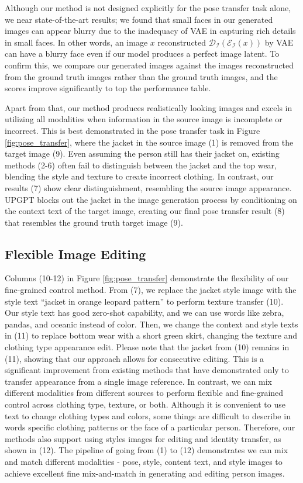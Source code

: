 \documentclass[10pt,twocolumn,letterpaper]{article}
\begin{document}
Although our method is not designed explicitly for the pose transfer task alone, we near state-of-the-art results; we found that small faces in our generated images can appear blurry due to the inadequacy of VAE in capturing rich details in small faces. In other words, an image $x$ reconstructed $\mathcal{D_I}(\mathcal{E_I}(x))$ by VAE can have a blurry face even if our model produces a perfect image latent. To confirm this, we compare our generated images against the images reconstructed from the ground truth images rather than the ground truth images, and the scores improve significantly to top the performance table. 

Apart from that, our method produces realistically looking images and excels in utilizing all modalities when information in the source image is incomplete or incorrect. This is best demonstrated in the pose transfer task in Figure \ref{fig:pose_transfer}, where the jacket in the source image (1) is removed from the target image (9). Even assuming the person still has their jacket on, existing methods (2-6) often fail to distinguish between the jacket and the top wear, blending the style and texture to create incorrect clothing. In contrast, our results (7) show clear distinguishment, resembling the source image appearance. UPGPT blocks out the jacket in the image generation process by conditioning on the context text of the target image, creating our final pose transfer result (8) that resembles the ground truth target image (9). 

\subsection{Flexible Image Editing}
Columns (10-12) in Figure \ref{fig:pose_transfer} demonstrate the flexibility of our fine-grained control method. From (7), we replace the jacket style image with the style text ``jacket in orange leopard pattern'' to perform texture transfer (10). Our style text has good zero-shot capability, and we can use words like zebra, pandas, and oceanic instead of color. Then, we change the context and style texts in (11) to replace bottom wear with a short green skirt, changing the texture and clothing type \ie appearance edit. Please note that the jacket from (10) remains in (11), showing that our approach allows for consecutive editing. This is a significant improvement from existing methods \cite{casd, nted, persion_dm} that have demonstrated only to transfer appearance from a single image reference. In contrast, we can mix different modalities from different sources to perform flexible and fine-grained control across clothing type, texture, or both. Although it is convenient to use text to change clothing types and colors, some things are difficult to describe in words \eg specific clothing patterns or the face of a particular person. Therefore, our methods also support using styles images for editing and identity transfer, as shown in (12). The pipeline of going from (1) to (12) demonstrates we can mix and match different modalities - pose, style, content text, and style images to achieve excellent fine mix-and-match in generating and editing person images. 
\end{document}
